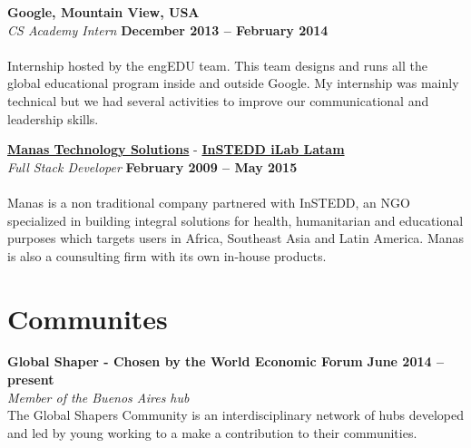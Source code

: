 \documentclass[margin,line]{resume}
\begin{document}
\begin{resume}
\textbf{Google, Mountain View, USA}\vspace{2mm}\\\vspace{1mm}
\textsl{CS Academy Intern} \hfill \textbf{December 2013 -- February 2014}\vspace{-3mm}\\\vspace{-1mm}
\\
Internship hosted by the engEDU team. This team designs and runs all the global educational program inside and outside Google. My internship was mainly technical but we had several activities to improve our communicational and leadership skills.

\textbf{\href{http://www.manas.com.ar/}{Manas Technology Solutions}} - 
\textbf{\href{http://www.instedd.org/}{InSTEDD iLab Latam}}\vspace{2mm}\\\vspace{1mm}
\textsl{Full Stack Developer} \hfill \textbf{February 2009 -- May 2015}\vspace{-3mm}\\\vspace{-1mm}
\\
Manas is a non traditional company partnered with InSTEDD, an NGO specialized in building integral solutions for health, humanitarian and educational purposes which targets users in Africa, Southeast Asia and Latin America. Manas is also a counsulting firm with its own in-house products.
\newpage


\section{\mysidestyle Communites}

\textbf{Global Shaper - Chosen by the World Economic Forum} \hfill \textbf{June 2014 -- present} \vspace{2mm}\\\vspace{1mm}
\textsl{Member of the Buenos Aires hub} \\
The Global Shapers Community is an interdisciplinary network of hubs developed and led by young  working to a make a contribution to their communities.



\end{resume}
\end{document}
